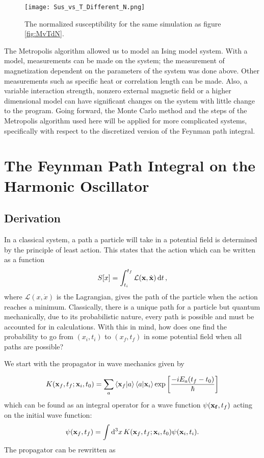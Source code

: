 \documentclass[11pt]{article}
\begin{document}
\begin{figure}[h]
	\centering
\texttt{[image: Sus\_vs\_T\_Different\_N.png]}
	\caption{The normalized susceptibility for the same simulation as figure \ref{fig:MvTdN}.}
	\label{fig:SvTdN}
\end{figure}

The Metropolis algorithm allowed us to model an Ising model system. With a model, measurements can be made on the system; the measurement of magnetization dependent on the parameters of the system was done above. Other measurements such as specific heat or correlation length can be made. Also, a variable interaction strength, nonzero external magnetic field or a higher dimensional model can have significant changes on the system with little change to the program. Going forward, the Monte Carlo method and the steps of the Metropolis algorithm used here will be applied for more complicated systems, specifically with respect to the discretized version of the Feynman path integral.

\section{The Feynman Path Integral on the Harmonic Oscillator}
\subsection{Derivation}
In a classical system, a path a particle will take in a potential field is determined by the principle of least action. This states that the action which can be written as a function 
\begin{align}
	S[x]=\int_{t_i}^{t_f}\mathcal{L}(\vb{x},\dot{\vb{x}})\dd{t},
	\label{eq:Action}
\end{align}
where $\mathcal{L}(x,\dot{x})$ is the Lagrangian, gives the path of the particle when the action reaches a minimum. Classically, there is a unique path for a particle but quantum mechanically, due to its probabilistic nature, every path is possible and must be accounted for in calculations. With this in mind, how does one find the probability to go from $(x_i,t_i)$ to $(x_f,t_f)$ in some potential field when all paths are possible?

We start with the propagator in wave mechanics given by \cite{QuantumBook}

\begin{align}
	K(\vb{x}_f,t_f;\vb{x}_i,t_0)=\sum_a\bra{\vb{x}_f}\ket{a}\bra{a}\ket{\vb{x}_i}\exp\left[\frac{-iE_a(t_f-t_0)}{\hbar}\right]
\end{align}
which can be found as an integral operator for a wave function $\psi(\vb{x_f},t_f)$ acting on the initial wave function:
\begin{align}
	\psi(\vb{x}_f,t_f)=\int\dd[3]{x}K(\vb{x}_f,t_f;\vb{x}_i,t_0)\psi(\vb{x}_i,t_i).
	\label{eq:WavFuncProp}
\end{align}
The propagator can be rewritten as
\end{document}
